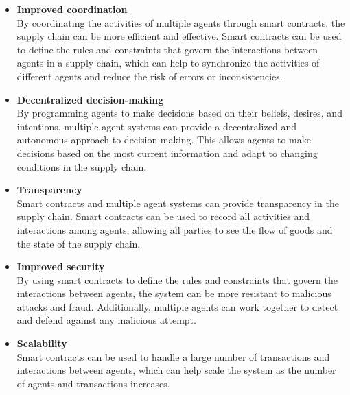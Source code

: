 \begin{itemize}
    
\item \textbf{Improved coordination} \\ By coordinating the activities of multiple agents through smart contracts, the supply chain can be more efficient and effective. Smart contracts can be used to define the rules and constraints that govern the interactions between agents in a supply chain, which can help to synchronize the activities of different agents and reduce the risk of errors or inconsistencies.

\vspace{.5cm}

\item \textbf{Decentralized decision-making} \\ By programming agents to make decisions based on their beliefs, desires, and intentions, multiple agent systems can provide a decentralized and autonomous approach to decision-making. This allows agents to make decisions based on the most current information and adapt to changing conditions in the supply chain.

\vspace{.5cm}

\item \textbf{Transparency} \\ Smart contracts and multiple agent systems can provide transparency in the supply chain. Smart contracts can be used to record all activities and interactions among agents, allowing all parties to see the flow of goods and the state of the supply chain.

\vspace{.5cm}

\item \textbf{Improved security} \\ By using smart contracts to define the rules and constraints that govern the interactions between agents, the system can be more resistant to malicious attacks and fraud. Additionally, multiple agents can work together to detect and defend against any malicious attempt.

\vspace{.5cm}

\item \textbf{Scalability} \\ Smart contracts can be used to handle a large number of transactions and interactions between agents, which can help scale the system as the number of agents and transactions increases.


\end{itemize}
